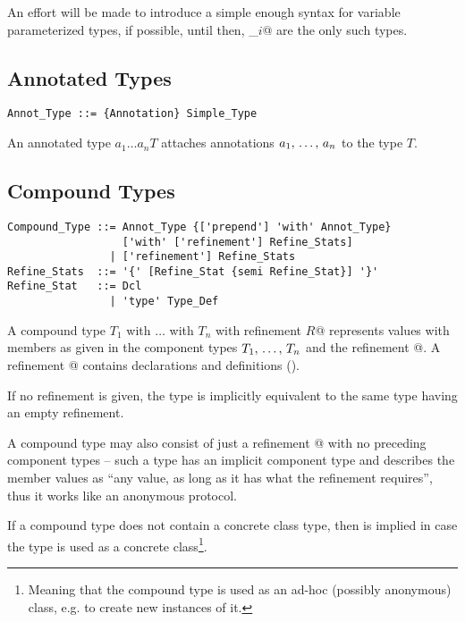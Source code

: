 An effort will be made to introduce a simple enough syntax for variable parameterized types, if possible, until then, \lstinline@Tuple_$i$@ are the only such types. 






\subsection{Annotated Types}

\syntax\begin{lstlisting}
Annot_Type ::= {Annotation} Simple_Type
\end{lstlisting}

An annotated type $a_1 \ldots a_n T$ attaches annotations $a_1 ,\, \ldots ,\, a_n$ to the type $T$. %






\subsection{Compound Types}
\label{sec:compound-types}

\syntax\begin{lstlisting}
Compound_Type ::= Annot_Type {['prepend'] 'with' Annot_Type} 
                  ['with' ['refinement'] Refine_Stats]
                | ['refinement'] Refine_Stats
Refine_Stats  ::= '{' [Refine_Stat {semi Refine_Stat}] '}'
Refine_Stat   ::= Dcl
                | 'type' Type_Def
\end{lstlisting} %

A compound type \lstinline@$T_1$ with $\ldots$ with $T_n$ with refinement {$R$}@ represents values with members as given in the component types $T_1 ,\, \ldots ,\, T_n$ and the refinement @. A refinement @ contains declarations and definitions (). 

If no refinement is given, the type is implicitly equivalent to the same type having an empty refinement. 

A compound type may also consist of just a refinement @ with no preceding component types -- such a type has an implicit component type  and describes the member values as ``any value, as long as it has what the refinement requires'', thus it works like an anonymous protocol. 

If a compound type does not contain a concrete class type, then  is implied in case the type is used as a concrete class\footnote{Meaning that the compound type is used as an ad-hoc (possibly anonymous) class, e.g. to create new instances of it.}.

